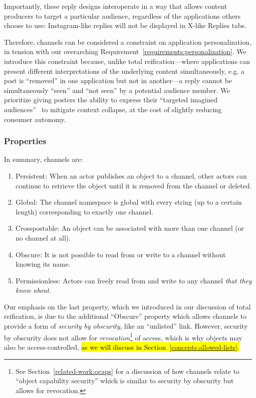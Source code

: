 Importantly, these reply designs interoperate in a way that allows content producers to target a particular audience,
regardless of the applications others choose to use:
Instagram-like replies will not be displayed in X-like Replies tabs.

Therefore, channels can be considered a constraint on application personalization,
in tension with our overarching Requirement~\ref{requirements:personalization}.
We introduce this constraint because, unlike total reification---where applications
can present different interpretations of the underlying
content simultaneously, e.g. a post is ``removed'' in one application but not in another---a reply
cannot be simultaneously ``seen'' and ``not seen'' by a potential audience member.
We prioritize giving posters the ability to express their ``targeted imagined audiences''~\cite{imaginedaudience}
to mitigate context collapse, at the cost of slightly reducing consumer autonomy.

\subsubsection{Properties}

In summary, channels are:

\begin{enumerate}
\item
Persistent: When an actor publishes an object to a channel, other actors can
continue to retrieve the object until it is removed from the channel or deleted.
\item
Global: The channel namespace is global with every string (up to a certain length)
corresponding to exactly one channel.
\item
Crosspostable: An object can be associated with more than one channel (or no channel at all).
\item
Obscure: It is not possible to read from or write to a channel without knowing
its name.
\item
Permissionless: Actors can freely read from and write to any channel \emph{that they know about}.
\end{enumerate}

Our emphasis on the last property, which we introduced in our discussion of
total reification, is due to the additional ``Obscure'' property
which allows channels to provide a form of \emph{security by obscurity}, like an ``unlisted'' link.
However, security by obscurity does not allow for \emph{revocation}\footnote{
    See Section~\ref{related-work:ocaps} for a discussion of how channels relate to ``object capability security''
    which is similar to security by obscurity but allows for revocation.
}
of access,
which is why objects may also be access-controlled,
\hl{%
as we will discuss in Section~{\ref{concepts:allowed-lists}}.
}%

